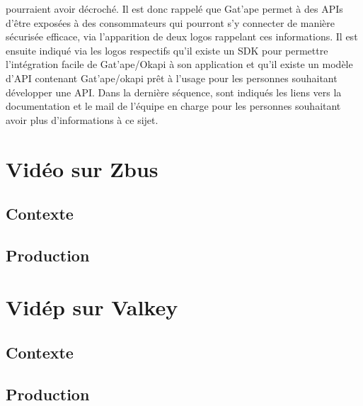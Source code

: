 pourraient avoir décroché. Il est donc rappelé que Gat'ape permet à des APIs d'être exposées à des consommateurs qui pourront s'y connecter de manière sécurisée efficace, via l'apparition de deux logos rappelant ces informations. Il est ensuite indiqué via les logos respectifs qu'il existe un SDK pour permettre l'intégration facile de Gat'ape/Okapi à son application et qu'il existe un modèle d'API contenant Gat'ape/okapi prêt à l'usage pour les personnes souhaitant développer une API. Dans la dernière séquence, sont indiqués les liens vers la documentation et le mail de l'équipe en charge pour les personnes souhaitant avoir plus d'informations à ce sijet. 



\section{Vidéo sur Zbus}

\subsection{Contexte}

\subsection{Production}



\section{Vidép sur Valkey}

\subsection{Contexte}

\subsection{Production}

